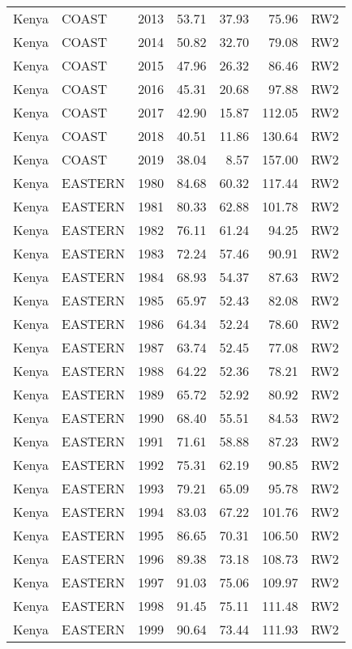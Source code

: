 \begin{longtable}{lllrrrl}
  Kenya & COAST & 2013 & 53.71 & 37.93 & 75.96 & RW2 \\ 
  Kenya & COAST & 2014 & 50.82 & 32.70 & 79.08 & RW2 \\ 
  Kenya & COAST & 2015 & 47.96 & 26.32 & 86.46 & RW2 \\ 
  Kenya & COAST & 2016 & 45.31 & 20.68 & 97.88 & RW2 \\ 
  Kenya & COAST & 2017 & 42.90 & 15.87 & 112.05 & RW2 \\ 
  Kenya & COAST & 2018 & 40.51 & 11.86 & 130.64 & RW2 \\ 
  Kenya & COAST & 2019 & 38.04 & 8.57 & 157.00 & RW2 \\ 
  Kenya & EASTERN & 1980 & 84.68 & 60.32 & 117.44 & RW2 \\ 
  Kenya & EASTERN & 1981 & 80.33 & 62.88 & 101.78 & RW2 \\ 
  Kenya & EASTERN & 1982 & 76.11 & 61.24 & 94.25 & RW2 \\ 
  Kenya & EASTERN & 1983 & 72.24 & 57.46 & 90.91 & RW2 \\ 
  Kenya & EASTERN & 1984 & 68.93 & 54.37 & 87.63 & RW2 \\ 
  Kenya & EASTERN & 1985 & 65.97 & 52.43 & 82.08 & RW2 \\ 
  Kenya & EASTERN & 1986 & 64.34 & 52.24 & 78.60 & RW2 \\ 
  Kenya & EASTERN & 1987 & 63.74 & 52.45 & 77.08 & RW2 \\ 
  Kenya & EASTERN & 1988 & 64.22 & 52.36 & 78.21 & RW2 \\ 
  Kenya & EASTERN & 1989 & 65.72 & 52.92 & 80.92 & RW2 \\ 
  Kenya & EASTERN & 1990 & 68.40 & 55.51 & 84.53 & RW2 \\ 
  Kenya & EASTERN & 1991 & 71.61 & 58.88 & 87.23 & RW2 \\ 
  Kenya & EASTERN & 1992 & 75.31 & 62.19 & 90.85 & RW2 \\ 
  Kenya & EASTERN & 1993 & 79.21 & 65.09 & 95.78 & RW2 \\ 
  Kenya & EASTERN & 1994 & 83.03 & 67.22 & 101.76 & RW2 \\ 
  Kenya & EASTERN & 1995 & 86.65 & 70.31 & 106.50 & RW2 \\ 
  Kenya & EASTERN & 1996 & 89.38 & 73.18 & 108.73 & RW2 \\ 
  Kenya & EASTERN & 1997 & 91.03 & 75.06 & 109.97 & RW2 \\ 
  Kenya & EASTERN & 1998 & 91.45 & 75.11 & 111.48 & RW2 \\ 
  Kenya & EASTERN & 1999 & 90.64 & 73.44 & 111.93 & RW2 \\ 

\end{longtable}
